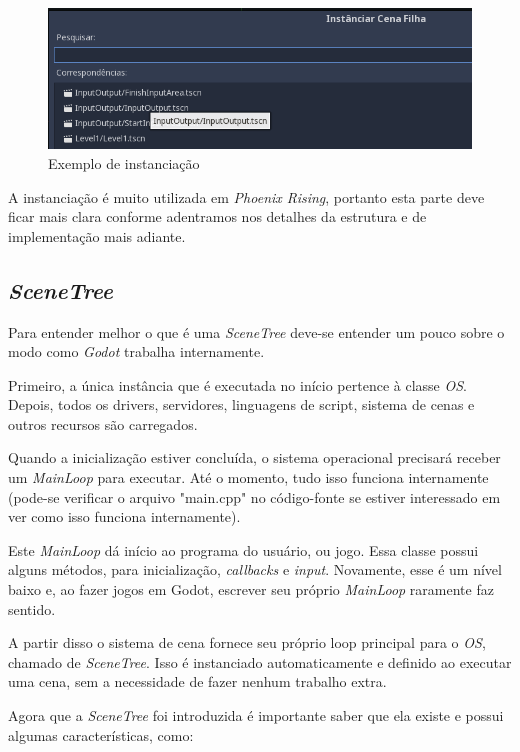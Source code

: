 \begin{figure}[H]
    \includegraphics[scale=0.7]{../figuras/exemplo_instanciando.png}
    \caption{Exemplo de instanciação}
\end{figure}

A instanciação é muito utilizada em \textit{Phoenix Rising}, portanto esta
parte deve ficar mais clara conforme adentramos nos detalhes da estrutura e
de implementação mais adiante.

\subsection{\textit{SceneTree}}

Para entender melhor o que é uma \textit{SceneTree} deve-se entender um pouco 
sobre o modo como \textit{Godot} trabalha internamente.

Primeiro, a única instância que é executada no 
início pertence à classe \textit{OS}. Depois, todos os drivers, servidores,
linguagens de script, sistema de cenas e outros recursos são carregados.

Quando a inicialização estiver concluída, o sistema operacional precisará 
receber um \textit{MainLoop} para executar. Até o momento, tudo isso funciona 
internamente (pode-se verificar o arquivo "main.cpp" no código-fonte se 
estiver interessado em ver como isso funciona internamente).

Este \textit{MainLoop} dá início ao programa do usuário, ou jogo. Essa classe
possui alguns métodos, para inicialização, \textit{callbacks} e \textit{input}. 
Novamente, esse é um nível baixo e, ao fazer jogos em Godot, escrever seu 
próprio \textit{MainLoop} raramente faz sentido.

A partir disso o sistema de cena fornece seu próprio loop principal para o 
\textit{OS}, chamado de \textit{SceneTree}. 
Isso é instanciado automaticamente e definido ao executar uma cena, sem a 
necessidade de fazer nenhum trabalho extra.

Agora que a \textit{SceneTree} foi introduzida é importante saber que ela existe
e possui algumas características, como:

